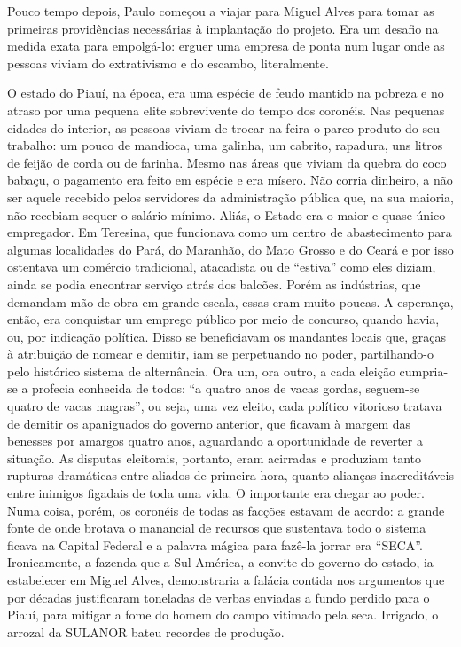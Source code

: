 Pouco tempo depois, Paulo começou a viajar para Miguel Alves para tomar as primeiras providências necessárias à implantação do projeto.
Era um desafio na medida exata para empolgá-lo: erguer uma empresa de ponta num lugar onde as pessoas viviam do extrativismo e do escambo, literalmente.


O estado do Piauí, na época, era uma espécie de feudo mantido na pobreza e no atraso por uma pequena elite sobrevivente do tempo dos coronéis.
Nas pequenas cidades do interior, as pessoas viviam de trocar na feira o parco produto do seu trabalho: um pouco de mandioca, uma galinha, um cabrito, rapadura, uns litros de feijão de corda ou de farinha.
Mesmo nas áreas que viviam da quebra do coco babaçu, o pagamento era feito em espécie e era mísero.
Não corria dinheiro, a não ser aquele recebido pelos servidores da administração pública que, na sua maioria, não recebiam sequer o salário mínimo.
Aliás, o Estado era o maior e quase único empregador.
Em Teresina, que funcionava como um centro de abastecimento para algumas localidades do Pará, do Maranhão, do Mato Grosso e do Ceará e por isso ostentava um comércio tradicional, atacadista ou de ``estiva'' como eles diziam, ainda se podia encontrar serviço atrás dos balcões.
Porém as indústrias, que demandam mão de obra em grande escala, essas eram muito poucas.
A esperança, então, era conquistar um emprego público por meio de concurso, quando havia, ou, por indicação política.
Disso se beneficiavam os mandantes locais que, graças à atribuição de nomear e demitir, iam se perpetuando no poder, partilhando-o pelo histórico sistema de alternância.
Ora um, ora outro, a cada eleição cumpria-se a profecia conhecida de todos: ``a quatro anos de vacas gordas, seguem-se quatro de vacas magras'', ou seja, uma vez eleito, cada político vitorioso tratava de demitir os apaniguados do governo anterior, que ficavam à margem das benesses por amargos quatro anos, aguardando a oportunidade de reverter a situação.
As disputas eleitorais, portanto, eram acirradas e produziam tanto rupturas dramáticas entre aliados de primeira hora, quanto alianças inacreditáveis entre inimigos figadais de toda uma vida.
O importante era chegar ao poder.
Numa coisa, porém, os coronéis de todas as facções estavam de acordo: a grande fonte de onde brotava o manancial de recursos que sustentava todo o sistema ficava na Capital Federal e a palavra mágica para fazê-la jorrar era ``SECA''.
Ironicamente, a fazenda que a Sul América, a convite do governo do estado, ia estabelecer em Miguel Alves, demonstraria a falácia contida nos argumentos que por décadas justificaram toneladas de verbas enviadas a fundo perdido para o Piauí, para mitigar a fome do homem do campo vitimado pela seca.
Irrigado, o arrozal da SULANOR bateu recordes de produção.

